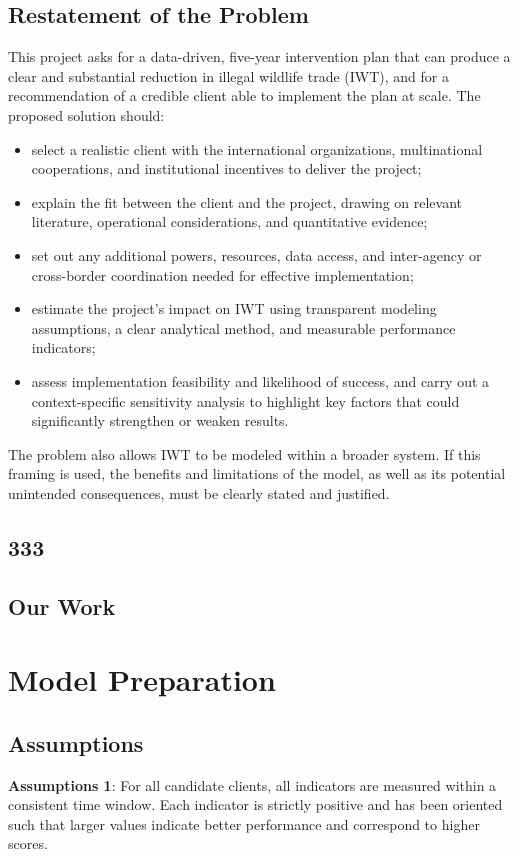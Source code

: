 \documentclass{mcmthesis}
\begin{document}
\subsection{Restatement of the Problem} This project asks for a data-driven, five-year intervention plan that can produce a clear and substantial reduction in illegal wildlife trade (IWT), and for a recommendation of a credible client able to implement the plan at scale. The proposed solution should: 
\begin{itemize} 
    \item select a realistic client with the international organizations, multinational cooperations, and institutional incentives to deliver the project; 
    \item explain the fit between the client and the project, drawing on relevant literature, operational considerations, and quantitative evidence;
    \item set out any additional powers, resources, data access, and inter-agency or cross-border coordination needed for effective implementation; 
    \item estimate the project’s impact on IWT using transparent modeling assumptions, a clear analytical method, and measurable performance indicators; 
    \item assess implementation feasibility and likelihood of success, and carry out a context-specific sensitivity analysis to highlight key factors that could significantly strengthen or weaken results. 
\end{itemize} 
The problem also allows IWT to be modeled within a broader system. If this framing is used, the benefits and limitations of the model, as well as its potential unintended consequences, must be clearly stated and justified.


\subsection{333}

\subsection{Our Work}
\vspace{0.5\baselineskip}




\section{Model Preparation}
\subsection{Assumptions}
\vspace{0.5\baselineskip}
\textbf{Assumptions 1}: For all candidate clients, all indicators are measured within a consistent time window. Each indicator is strictly positive and has been oriented such that larger values indicate better performance and correspond to higher scores.
\end{document}
